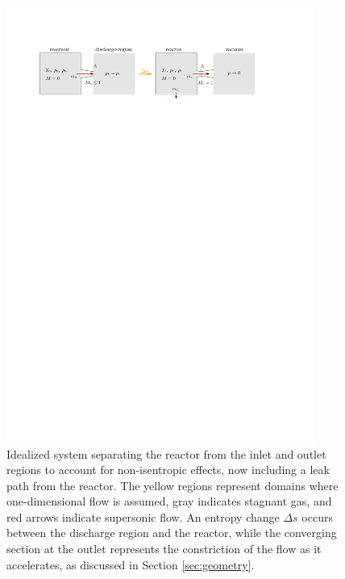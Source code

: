 	\begin{figure}[H]
	    \centering
	    \includegraphics[width=0.9\textwidth]{src/03_analytical-work/fig_disconnected-reservoirs-with-leak.pdf}
	    \caption{
	        Idealized system separating the reactor from the inlet and outlet regions to account for non-isentropic effects, now including a leak path from the reactor.
	        The yellow regions represent domains where one-dimensional flow is assumed, gray indicates stagnant gas, and red arrows indicate supersonic flow.
	        An entropy change $\Delta s$ occurs between the discharge region and the reactor, while the converging section at the outlet represents the constriction of the flow as it accelerates, as discussed in Section \ref{sec:geometry}.
	    }
	    \label{fig:disconnected-reservoirs-leak}
	\end{figure}

